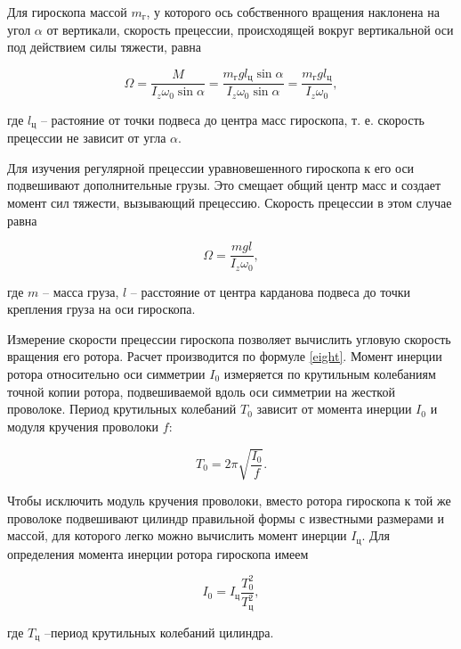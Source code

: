     Для гироскопа массой $ m_\text{г} $, у которого ось собственного вращения наклонена на угол $ \alpha $ от вертикали, скорость прецессии, происходящей вокруг вертикальной оси под действием силы тяжести, равна

\[
\Omega = \frac{M}{I_z\omega_0\sin \alpha} = \frac{m_\text{г}gl_\text{ц}\sin\alpha}{I_z\omega_0\sin\alpha} = \frac{m_\text{г}gl_\text{ц}}{I_z\omega_0},
\]

    где $ l_\text{ц} $ -- растояние от точки подвеса до центра масс гироскопа, т. е. скорость прецессии не зависит от угла $ \alpha $.

    Для изучения регулярной прецессии уравновешенного гироскопа к его оси подвешивают дополнительные грузы. Это смещает общий центр масс и создает момент сил тяжести, вызывающий прецессию. Скорость прецессии в этом случае равна

\begin{equation}
\Omega = \frac{mgl}{I_z\omega_0},
\label{eight}
\end{equation}

    где $ m $ -- масса груза, $ l $ -- расстояние от центра карданова подвеса до точки крепления груза на оси гироскопа.

    Измерение скорости прецессии гироскопа позволяет вычислить угловую скорость вращения его ротора. Расчет производится по формуле \eqref{eight}. Момент инерции ротора относительно оси симметрии $ I_0 $ измеряется по крутильным колебаниям точной копии ротора, подвешиваемой вдоль оси симметрии на жесткой проволоке. Период крутильных колебаний $ T_0 $ зависит от момента инерции $ I_0 $ и модуля кручения проволоки $ f $:

\[
T_0 = 2\pi\sqrt{\frac{I_0}{f}}.
\label{nine}
\]

    Чтобы исключить модуль кручения проволоки, вместо ротора гироскопа к той же проволоке подвешивают цилиндр правильной формы с известными размерами и массой, для которого легко можно вычислить момент инерции $ I_\text{ц} $. Для определения момента инерции ротора гироскопа имеем 

\begin{equation}
I_0=I_\text{ц}\frac{T_0^2}{T_\text{ц}^2},
\label{ten}
\end{equation}

    где $ T_\text{ц} $ --период крутильных колебаний цилиндра.\\
    
    
    
    
    
    
    
